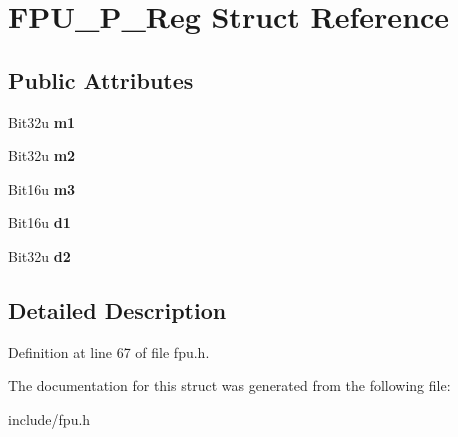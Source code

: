 \hypertarget{structFPU__P__Reg}{\section{F\-P\-U\-\_\-\-P\-\_\-\-Reg Struct Reference}
\label{structFPU__P__Reg}
}
\subsection*{Public Attributes}
\begin{DoxyCompactItemize}
\item 
\hypertarget{structFPU__P__Reg_a6891fdbb0f3fd7a10055ecfc0404014f}{Bit32u {\bfseries m1}}\label{structFPU__P__Reg_a6891fdbb0f3fd7a10055ecfc0404014f}

\item 
\hypertarget{structFPU__P__Reg_a279a18d4e87be85c345144eb59d972d6}{Bit32u {\bfseries m2}}\label{structFPU__P__Reg_a279a18d4e87be85c345144eb59d972d6}

\item 
\hypertarget{structFPU__P__Reg_a388e65500cd3d7e74fe1a2ce5b16c406}{Bit16u {\bfseries m3}}\label{structFPU__P__Reg_a388e65500cd3d7e74fe1a2ce5b16c406}

\item 
\hypertarget{structFPU__P__Reg_abce65930a4465a5a3e3429e0e66b80e7}{Bit16u {\bfseries d1}}\label{structFPU__P__Reg_abce65930a4465a5a3e3429e0e66b80e7}

\item 
\hypertarget{structFPU__P__Reg_a956b25eccf4a855e1fc9b80f06872775}{Bit32u {\bfseries d2}}\label{structFPU__P__Reg_a956b25eccf4a855e1fc9b80f06872775}

\end{DoxyCompactItemize}


\subsection{Detailed Description}


Definition at line 67 of file fpu.\-h.



The documentation for this struct was generated from the following file\-:\begin{DoxyCompactItemize}
\item 
include/fpu.\-h\end{DoxyCompactItemize}
